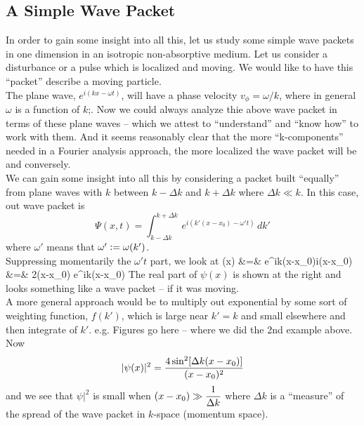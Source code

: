 \subsection{A Simple Wave Packet}
In order to gain some insight into all this, let us study some simple wave packets in one dimension in an isotropic non-absorptive medium. Let us consider a disturbance or a pulse which is localized and moving. 
We would like to have this ``packet'' describe a moving particle. \\
The plane wave, $e^{i(kx - \omega t)}$, will have a phase velocity $v_\phi = \omega/k$, where in general $\omega$ is a function of $k$;. Now we could always analyze thie above wave packet in terms of these plane waves -- which we
attest to ``understand'' and ``know how'' to work with them. And it seems reasonably clear that the more ``k-components'' needed in a Fourier analysis approach, the more localized the wave packet will be and conversely.\\
We can gain some insight into all this by considering a packet built ``equally'' from plane waves with $k$ between $k-\Delta k$ and $k + \Delta k$ where $\Delta k \ll k$. In this case, out wave packet is 
$$\Psi(x,t) = \int_{k-\Delta k}^{k + \Delta k}\, e^{i(k'(x-x_0) - \omega't)}\, dk'$$ where $\omega'$ means that $\omega' \mathrel{\mathop:}= \omega(k')$.\\
Suppressing momentarily the $\omega't$ part, we look at 
\bearray
\psi(x) &=& {e^{ik(x-x_0)}\over i(x-x_0)} \\
&=& 2{\sin[\Delta k(x-x_0)]\over (x-x_0)} e^{ik(x-x_0)}
\eearray
The real part of $\psi(x)$ is shown at the right and looks something like a wave packet -- if it was moving.\\
A more general approach would be to multiply out exponential by some sort of weighting function, $f(k')$, which is large near $k'=k$ and small elsewhere and then integrate of $k'$. 
e.g. Figures go here -- where we did the 2nd example above. \\
Now $$|\psi(x)|^2 = {4 \sin^2[ \Delta k(x-x_0)]\over (x-x_0)^2}$$  and we see that $\psi|^2$ is small when $\displaystyle (x-x_0)\gg {1\over \Delta k}$ where $\Delta k$ is a ``measure'' of the spread of the wave packet
in $k$-space (momentum space).\\

